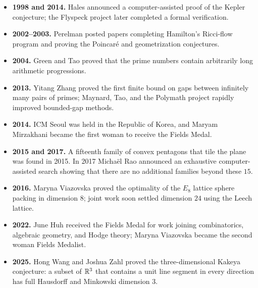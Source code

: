 \begin{itemize}
              with Richard Taylor, proved Fermat's Last Theorem through the
              modularity of semistable elliptic curves.
        \item \textbf{1998 and 2014.} Hales announced a computer-assisted proof
              of the Kepler conjecture; the Flyspeck project later completed a
              formal verification.
        \item \textbf{2002--2003.} Perelman posted papers completing Hamilton's
              Ricci-flow program and proving the Poincaré and geometrization
              conjectures.
        \item \textbf{2004.} Green and Tao proved that the prime numbers contain
              arbitrarily long arithmetic progressions.
        \item \textbf{2013.} Yitang Zhang proved the first finite bound on gaps
              between infinitely many pairs of primes; Maynard, Tao, and the
              Polymath project rapidly improved bounded-gap methods.
        \item \textbf{2014.} ICM Seoul was held in the Republic of Korea, and Maryam
              Mirzakhani became the first woman to receive the Fields Medal.
        \item \textbf{2015 and 2017.} A fifteenth family of convex pentagons
              that tile the plane was found in 2015. In 2017 Micha\"el Rao
              announced an exhaustive computer-assisted search showing that
              there are no additional families beyond these $15$.
        \item \textbf{2016.} Maryna Viazovska proved the optimality of the
              $E_8$ lattice sphere packing in dimension $8$; joint work soon
              settled dimension $24$ using the Leech lattice.
        \item \textbf{2022.} June Huh received the Fields Medal for work joining
              combinatorics, algebraic geometry, and Hodge theory; Maryna
              Viazovska became the second woman Fields Medalist.
        \item \textbf{2025.} Hong Wang and Joshua Zahl proved the
              three-dimensional Kakeya conjecture: a subset of $\mathbb{R}^3$ that
              contains a unit line segment in every direction has full
              Hausdorff and Minkowski dimension $3$.
    \end{itemize}


